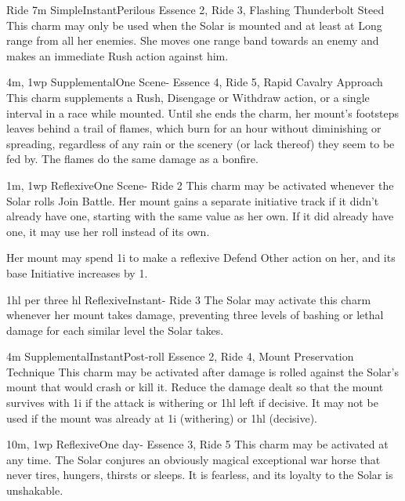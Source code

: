 \begin{Ability}{Ride}
  {7m}
  {Simple}{Instant}{Perilous}
  {Essence 2, Ride 3, Flashing Thunderbolt Steed}
  This charm may only be used when the Solar is mounted and at least at Long range from all her enemies. She moves one range band towards an enemy and makes an immediate Rush action against him.

  {4m, 1wp}
  {Supplemental}{One Scene}{-}
  {Essence 4, Ride 5, Rapid Cavalry Approach}
  This charm supplements a Rush, Disengage or Withdraw action, or a single interval in a race while mounted. Until she ends the charm, her mount's footsteps leaves behind a trail of flames, which burn for an hour without diminishing or spreading, regardless of any rain or the scenery (or lack thereof) they seem to be fed by. The flames do the same damage as a bonfire.

  {1m, 1wp}
  {Reflexive}{One Scene}{-}
  {Ride 2}
  This charm may be activated whenever the Solar rolls Join Battle. Her mount gains a separate initiative track if it didn't already have one, starting with the same value as her own. If it did already have one, it may use her roll instead of its own.

  Her mount may spend 1i to make a reflexive Defend Other action on her, and its base Initiative increases by 1.

  {1hl per three hl}
  {Reflexive}{Instant}{-}
  {Ride 3}
  The Solar may activate this charm whenever her mount takes damage, preventing three levels of bashing or lethal damage for each similar level the Solar takes.

  {4m}
  {Supplemental}{Instant}{Post-roll}
  {Essence 2, Ride 4, Mount Preservation Technique}
  This charm may be activated after damage is rolled against the Solar's mount that would crash or kill it. Reduce the damage dealt so that the mount survives with 1i if the attack is withering or 1hl left if decisive. It may not be used if the mount was already at 1i (withering) or 1hl (decisive).

  {10m, 1wp}
  {Reflexive}{One day}{-}
  {Essence 3, Ride 5}
  This charm may be activated at any time. The Solar conjures an obviously magical exceptional war horse that never tires, hungers, thirsts or sleeps. It is fearless, and its loyalty to the Solar is unshakable.

\end{Ability}

